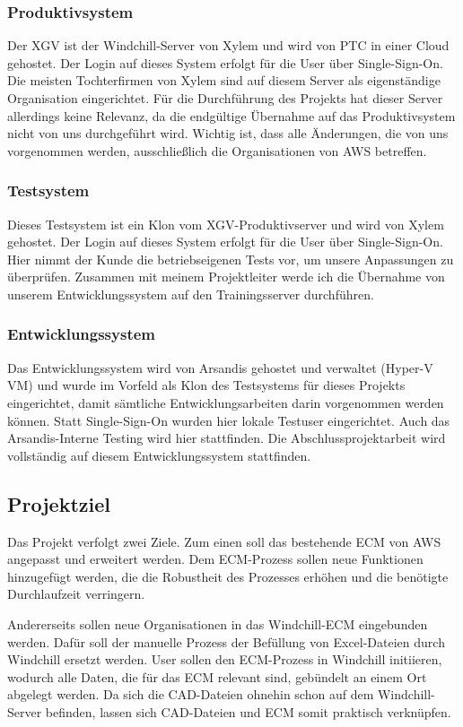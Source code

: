 \subsubsection*{Produktivsystem}
Der \acl{XGV} ist der Windchill-Server von Xylem und wird von PTC in einer Cloud gehostet.
Der Login auf dieses System erfolgt für die User über Single-Sign-On.
Die meisten Tochterfirmen von Xylem sind auf diesem Server als eigenständige Organisation eingerichtet.
Für die Durchführung des Projekts hat dieser Server allerdings keine Relevanz, da die endgültige Übernahme auf das Produktivsystem nicht von uns durchgeführt wird.
Wichtig ist, dass alle Änderungen, die von uns vorgenommen werden, ausschließlich die Organisationen von \ac{AWS} betreffen.

\subsubsection*{Testsystem}
Dieses Testsystem ist ein Klon vom \ac{XGV}-Produktivserver und wird von Xylem gehostet.
Der Login auf dieses System erfolgt für die User über Single-Sign-On.
Hier nimmt der Kunde die betriebseigenen Tests vor, um unsere Anpassungen zu überprüfen.
Zusammen mit meinem Projektleiter werde ich die Übernahme von unserem Entwicklungssystem auf den Trainingsserver durchführen.

\subsubsection*{Entwicklungssystem}
Das Entwicklungssystem wird von Arsandis gehostet und verwaltet (Hyper-V VM) und wurde im Vorfeld als Klon des Testsystems für dieses Projekts eingerichtet, damit sämtliche Entwicklungsarbeiten darin vorgenommen werden können.
Statt Single-Sign-On wurden hier lokale Testuser eingerichtet.
Auch das Arsandis-Interne Testing wird hier stattfinden.
Die Abschlussprojektarbeit wird vollständig auf diesem Entwicklungssystem stattfinden.

\subsection{Projektziel} 
\label{sec:Projektziel}
Das Projekt verfolgt zwei Ziele.
Zum einen soll das bestehende \ac{ECM} von \ac{AWS} angepasst und erweitert werden.
Dem \ac{ECM}-Prozess sollen neue Funktionen hinzugefügt werden, die die Robustheit des Prozesses erhöhen und die benötigte Durchlaufzeit verringern.

Andererseits sollen neue Organisationen in das Windchill-\ac{ECM} eingebunden werden.
Dafür soll der manuelle Prozess der Befüllung von Excel-Dateien durch Windchill ersetzt werden.
User sollen den \ac{ECM}-Prozess in Windchill initiieren, wodurch alle Daten, die für das \ac{ECM} relevant sind, gebündelt an einem Ort abgelegt werden.
Da sich die CAD-Dateien ohnehin schon auf dem Windchill-Server befinden, lassen sich CAD-Dateien und \ac{ECM} somit praktisch verknüpfen.

